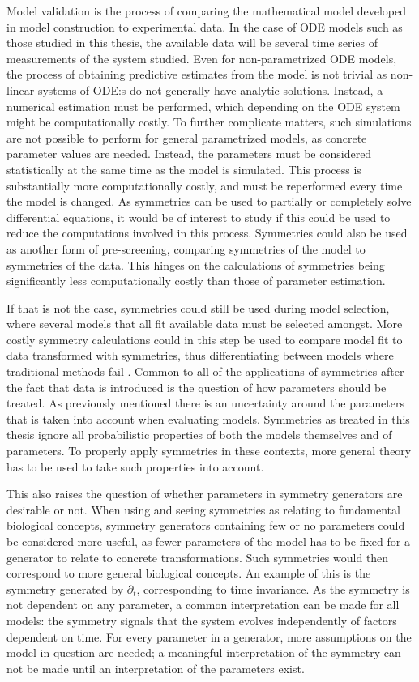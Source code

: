 Model validation is the process of comparing the mathematical model developed in model construction to experimental data.
In the case of ODE models such as those studied in this thesis, the available data will be several time series of measurements of the system studied.
Even for non-parametrized ODE models, the process of obtaining predictive estimates from the model is not trivial as non-linear systems of ODE:s do not generally have analytic solutions.
Instead, a numerical estimation must be performed, which depending on the ODE system might be computationally costly.
To further complicate matters, such simulations are not possible to perform for general parametrized models, as concrete parameter values are needed.
Instead, the parameters must be considered statistically at the same time as the model is simulated.
This process is substantially more computationally costly, and must be reperformed every time the model is changed.
As symmetries can be used to partially or completely solve differential equations, it would be of interest to study if this could be used to reduce the computations involved in this process.
Symmetries could also be used as another form of pre-screening, comparing symmetries of the model to symmetries of the data.
This hinges on the calculations of symmetries being significantly less computationally costly than those of parameter estimation.

If that is not the case, symmetries could still be used during model selection, where several models that all fit available data must be selected amongst.
More costly symmetry calculations could in this step be used to compare model fit to data transformed with symmetries, thus differentiating between models where traditional methods fail \cite{ohlsson2020symmetry}.
Common to all of the applications of symmetries after the fact that data is introduced is the question of how parameters should be treated.
As previously mentioned there is an uncertainty around the parameters that is taken into account when evaluating models.
Symmetries as treated in this thesis ignore all probabilistic properties of both the models themselves and of parameters.
To properly apply symmetries in these contexts, more general theory has to be used to take such properties into account.

This also raises the question of whether parameters in symmetry generators are desirable or not.
When using and seeing symmetries as relating to fundamental biological concepts, symmetry generators containing few or no parameters could be considered more useful, as fewer parameters of the model has to be fixed for a generator to relate to concrete transformations.
Such symmetries would then correspond to more general biological concepts.
An example of this is the symmetry generated by \(\partial_t\), corresponding to time invariance.
As the symmetry is not dependent on any parameter, a common interpretation can be made for all models: the symmetry signals that the system evolves independently of factors dependent on time.
For every parameter in a generator, more assumptions on the model in question are needed; a meaningful interpretation of the symmetry can not be made until an interpretation of the parameters exist.

